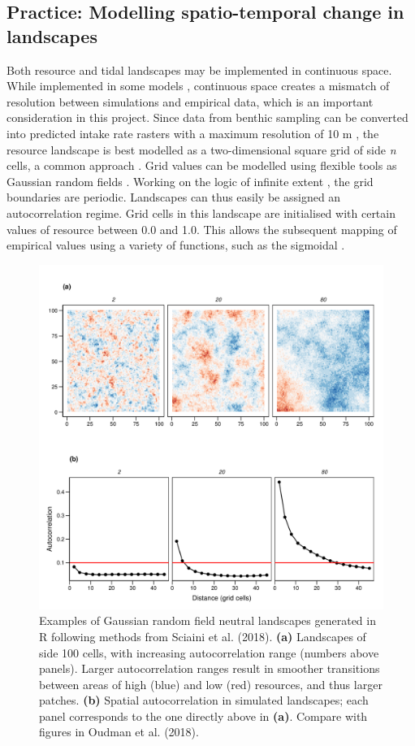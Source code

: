 \subsection{Practice: Modelling spatio-temporal change in landscapes}

Both resource and tidal landscapes may be implemented in continuous
space. While implemented in some models
\citep[e.g.][]{spiegel2013, spiegel2017}, continuous space creates a
mismatch of resolution between simulations and empirical data, which is
an important consideration in this project. Since data from benthic
sampling can be converted into predicted intake rate rasters with a
maximum resolution of 10 m \citetext{\citealp[see method
in][]{bijleveld2012}; \citealp[examples in][]{oudman2018}}, the resource
landscape is best modelled as a two-dimensional square grid of side
\emph{n} cells, a common approach
\citep{nolet2002, vangils2010, getz2015, netz2017}. Grid values can be
modelled using flexible tools \citep{sciaini2018} as Gaussian random
fields \citep{turner2015d, kery2019}. Working on the logic of infinite
extent \citep{nolet2006}, the grid boundaries are periodic. Landscapes
can thus easily be assigned an autocorrelation regime. Grid cells in
this landscape are initialised with certain values of resource between
0.0 and 1.0. This allows the subsequent mapping of empirical values
using a variety of functions, such as the sigmoidal
\citep{gershenfeld1999}.

\begin{figure}
    
    \includegraphics[width=0.7\linewidth]{intro_essay_figure3.png}
    \caption{Examples of Gaussian random field neutral landscapes generated in R
  following methods from Sciaini et al. (2018). \textbf{(a)} Landscapes of side
  100 cells, with increasing autocorrelation range (numbers above panels).
  Larger autocorrelation ranges result in smoother transitions between
  areas of high (blue) and low (red) resources, and thus larger patches.
  \textbf{(b)} Spatial autocorrelation in simulated landscapes; each panel
  corresponds to the one directly above in \textbf{(a)}. Compare with figures
  in Oudman et al. (2018).}
    \label{fig:intro_essay_figure3}
\end{figure}

